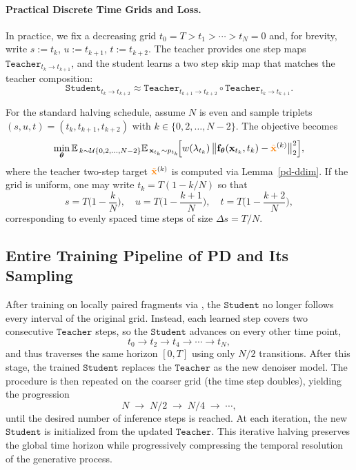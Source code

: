 \paragraph{Practical Discrete Time Grids and Loss.}
In practice, we fix a decreasing grid $t_0=T>t_1>\cdots>t_N=0$ and, for brevity, write $s:=t_k$, $u:=t_{k+1}$, $t:=t_{k+2}$.
The teacher provides one step maps $\mathtt{Teacher}_{t_k\to t_{k+1}}$, and the student learns a two step skip map that matches the teacher composition:
\[
\mathtt{Student}_{t_k\to t_{k+2}}
 \approx 
\mathtt{Teacher}_{t_{k+1}\to t_{k+2}}
\circ
\mathtt{Teacher}_{t_{k}\to t_{k+1}}.
\]

For the standard halving schedule, assume $N$ is even and sample
triplets $(s,u,t)=(t_k,t_{k+1},t_{k+2})$ with
$k\in\{0,2,\ldots,N-2\}$.
The objective  becomes
\[
\min_{\bm{\theta}} 
\mathbb{E}_{\,k \sim \mathcal{U}\{0,2,\ldots,N{-}2\}}
\mathbb{E}_{\,{\mathbf{x}}_{t_k}\sim p_{t_k}}\!
\Big[
  w(\lambda_{t_k})\,
  \big\|
  {\mathbf{f}}_{\bm{\theta}}({\mathbf{x}}_{t_k},t_k) - {\color{orange}\tilde{{\mathbf{x}}}}^{(k)}
  \big\|_2^2
\Big],
\]
where the teacher two-step target ${\color{orange}\tilde{{\mathbf{x}}}}^{(k)}$ is computed via Lemma~\ref{pd-ddim}.  If the grid is uniform, one may write $t_k = T(1 - k/N)$ so that
\[
s = T\Big(1 - \frac{k}{N}\Big),\quad
u = T\Big(1 - \frac{k+1}{N}\Big),\quad
t = T\Big(1 - \frac{k+2}{N}\Big),
\]
corresponding to evenly spaced time steps of size $\Delta s =  T/N$.


\subsection{Entire Training Pipeline of PD and Its Sampling}\label{subsec:pd-training}
After training on locally paired fragments via , the $\mathtt{Student}$ no longer follows every interval of the original grid. Instead, each learned step covers two consecutive $\mathtt{Teacher}$ steps, so the $\mathtt{Student}$ advances on every other time point,
\[
t_0 \to t_2 \to t_4 \to \cdots \to t_N,
\]
and thus traverses the same horizon $[0,T]$ using only $N/2$ transitions. After this stage, the trained $\mathtt{Student}$ replaces the $\mathtt{Teacher}$ as the new denoiser model. The procedure is then repeated on the coarser grid (the time step doubles), yielding the progression
\[
N \;\to\; N/2 \;\to\; N/4 \;\to\; \cdots,
\]
until the desired number of inference steps is reached. At each iteration, the new $\mathtt{Student}$ is initialized from the updated $\mathtt{Teacher}$. This iterative halving preserves the global time horizon while progressively compressing the temporal resolution of the generative process.

